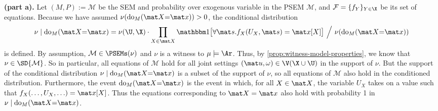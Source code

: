 \begin{subappendices}
\begin{lproof}\label{proof:condition-intervention-alignment}
    \textbf{(part a).}
    \def\doXx{\mathrm{do}_{M}(\mat X{=}\mat x)}
    Let $(M, P) := \mathcal M$ be the SEM and probability over exogenous variable in the PSEM $\mathcal M$, and 
        $\mathcal F = \{ f_Y \}_{Y \in \X}$ be its set of equations. 
    Because we have assumed $\nu(\doXx) > 0$,
    the conditional distribution 
    \[ 
        \nu\mid \doXx = \nu(\U, \X) \cdot 
        \prod_{X \in \mat X}
        \mathbbm 1\big[\forall \mat s. f_X(U_X, \mat s) = \mat x[X]\big]
        ~\Big/~ 
        \nu(\doXx) 
    \]
    is defined. By assumption, $\mathcal M \in \PSEMs(\nu)$ and $\nu$ is a witness to $\mu \models \Ar$. Thus, by \cref{prop:witness-model-properties}, we know that $\nu \in \SD{\mathcal M}$. 
    So in particular, all equations of $\mathcal M$ hold for all joint settings $(\mat u, \omega) \in \V(\X \cup \U)$ in the support of $\nu$. But the support of the conditional distribution $\nu \mid \doXx$ is a subset of the support of $\nu$, so all equations of $\mathcal M$ also hold in the conditioned distribution.  
    Furthermore, 
        the event $\doXx$ is the event in which, for all $X \in \mat X$, the variable $U_X$ takes on a value such that $f_X(\ldots, U_X,\ldots) = \mat x[X]$.  
    Thus the equations corresponding to $\mat X = \mat x$ also hold with probability 1 in $\nu \mid \doXx$.


\end{lproof}
\end{subappendices}
